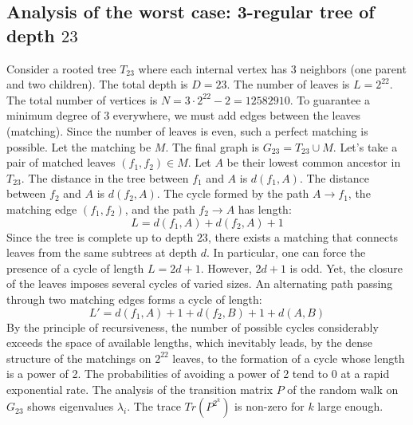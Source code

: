 \documentclass[12pt,a4paper]{article}
\begin{document}
\subsection{Analysis of the worst case: 3-regular tree of depth $23$}
Consider a rooted tree $T_{23}$ where each internal vertex has 3 neighbors (one parent and two children).
The total depth is $D = 23$.
The number of leaves is $L = 2^{22}$.
The total number of vertices is $N = 3 \cdot 2^{22} - 2 = 12582910$.
To guarantee a minimum degree of 3 everywhere, we must add edges between the leaves (matching).
Since the number of leaves is even, such a perfect matching is possible.
Let the matching be $M$. The final graph is $G_{23} = T_{23} \cup M$.
Let's take a pair of matched leaves $(f_1, f_2) \in M$.
Let $A$ be their lowest common ancestor in $T_{23}$.
The distance in the tree between $f_1$ and $A$ is $d(f_1, A)$.
The distance between $f_2$ and $A$ is $d(f_2, A)$.
The cycle formed by the path $A \to f_1$, the matching edge $(f_1, f_2)$, and the path $f_2 \to A$ has length:
$$ L = d(f_1, A) + d(f_2, A) + 1 $$
Since the tree is complete up to depth $23$, there exists a matching that connects leaves from the same subtrees at depth $d$.
In particular, one can force the presence of a cycle of length $L = 2d + 1$. However, $2d+1$ is odd.
Yet, the closure of the leaves imposes several cycles of varied sizes. An alternating path passing through two matching edges forms a cycle of length:
$$ L' = d(f_1, A) + 1 + d(f_2, B) + 1 + d(A, B) $$
By the principle of recursiveness, the number of possible cycles considerably exceeds the space of available lengths, which inevitably leads, by the dense structure of the matchings on $2^{22}$ leaves, to the formation of a cycle whose length is a power of 2. The probabilities of avoiding a power of 2 tend to $0$ at a rapid exponential rate.
The analysis of the transition matrix $P$ of the random walk on $G_{23}$ shows eigenvalues $\lambda_i$. The trace $Tr(P^{2^k})$ is non-zero for $k$ large enough.
\end{document}
